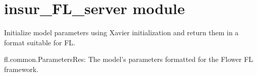 \documentclass[letterpaper,10pt,english]{sphinxmanual}
\begin{document}
\begin{fulllineitems}
\begin{description}
\end{description}

\end{fulllineitems}


\sphinxstepscope


\section{insur\_FL\_server module}
\label{\detokenize{insur_FL_server:module-insur_FL_server}}\label{\detokenize{insur_FL_server:insur-fl-server-module}}\label{\detokenize{insur_FL_server::doc}}

\begin{fulllineitems}
\label{\detokenize{insur_FL_server:insur_FL_server.init_parameters}}
\pysigstartsignatures
{}
\pysigstopsignatures
\sphinxAtStartPar
Initialize model parameters using Xavier initialization and return them in a format suitable for FL.
\begin{description}
\sphinxAtStartPar
fl.common.ParametersRes: The model’s parameters formatted for the Flower FL framework.

\end{description}

\end{fulllineitems}

\end{document}
